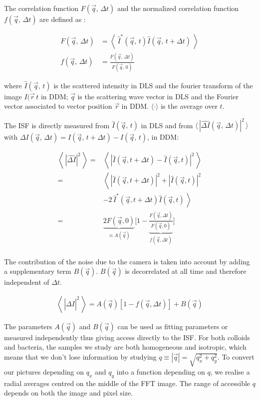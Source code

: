 \documentclass[%
 aip,
 jmp,%
 amsmath,amssymb,
reprint,%
]{revtex4-1}
\begin{document}
The correlation function $F(\vec{q}, \, \Delta t)$ and the normalized correlation function $f(\vec{q}, \, \Delta t)$ are defined as \citep{19_goodman2005introduction} :

\begin{align}
F(\vec{q}, \, \Delta t) &= \left\langle \ \hat{I}^*(\vec{q},\, t) \hat{I}(\vec{q},\, t+\Delta t) \ \right\rangle \\
f(\vec{q}, \, \Delta t) &= \frac{F(\vec{q}, \, \Delta t)}{F(\vec{q}, \, 0)}
\end{align}

where $\hat{I}(\vec{q}, \, t)$ is the scattered intensity in DLS and the fourier transform of the image ${I(\vec{r} \, t}$ in DDM; $\vec{q}$ is the scattering wave vector in DLS and the Fourier vector associated to vector position $\vec{r}$ in DDM. $\langle \cdot \rangle$ is the average over $t$.

The ISF  is directly measured from $\hat{I}(\vec{q}, \, t)$ in DLS and from $\langle \, | \widehat{\Delta I}(\vec{q},\,\Delta t)|^2 \, \rangle$ with $\Delta I(\vec{q},\,\Delta t) = I(\vec{q},\, t+\Delta t) - I(\vec{q},\, t)$, in DDM:

\begin{align*}
\left\langle \, \left|\widehat{\Delta I}\right|^2 \, \right\rangle =& \left\langle \, \left|\widehat{I}(\vec{q},t+\Delta t) - \widehat{I}(\vec{q},t)\right|^2 \, \right\rangle \\
=& \left\langle \, \left|\widehat{I}(\vec{q},t+ \Delta t)\right|^2 + \left|\widehat{I}(\vec{q},t)\right|^2\right. \\
&\left.- 2 \, \widehat{I}^*(\vec{q},t+\Delta t) \widehat{I}(\vec{q},t) \, \right\rangle\\
=& \underbrace{2F(\vec{q}, 0)}_{\equiv A(\vec{q})} \bigg[ 1-\underbrace{\frac{F(\vec{q}, \Delta t)}{F(\vec{q}, 0)}}_{f(\vec{q}, \Delta t)} \bigg]\\
\end{align*}

The contribution of the noise due to the camera is taken into account by adding a supplementary term $B(\vec{q})$. $B(\vec{q})$ is decorrelated  at all time and therefore independent of $\Delta t$.

\begin{eqnarray}
\left\langle \, \left|\widehat{\Delta I}\right|^2 \, \right\rangle = A(\vec{q})\left[1-f(\vec{q}, \Delta t)\right] + B(\vec{q})
\end{eqnarray}

The parameters $A(\vec{q})$ and $B(\vec{q})$ can be used as fitting parameters or measured independently thus giving access directly to the ISF. For both colloids and bacteria, the samples we study are both homogeneous and isotropic, which means that we don't lose information by studying $q \equiv |\vec{q}| = \sqrt{q_x^2 + q_y ^2}$. To convert our pictures depending on $q_x$ and $q_y$ into a function depending on $q$, we realise a radial averages centred on the middle of the FFT image. The range of accessible $q$ depends on both the image and pixel size.
\end{document}
